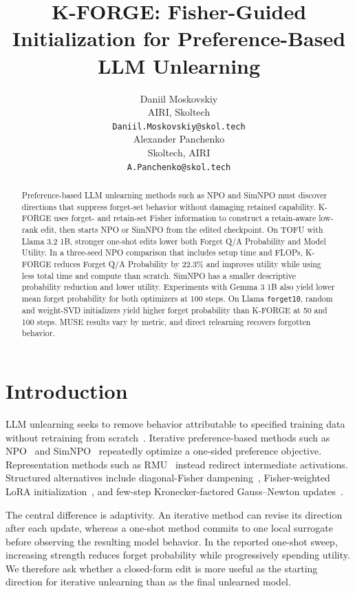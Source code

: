 \documentclass[11pt]{article}
\title{K-FORGE: Fisher-Guided Initialization for Preference-Based LLM Unlearning}
\author{Daniil Moskovskiy \\
  AIRI, Skoltech \\
  \texttt{Daniil.Moskovskiy@skol.tech} \\\And
  Alexander Panchenko \\
  Skoltech, AIRI \\
  \texttt{A.Panchenko@skol.tech} \\}
\begin{document}
\maketitle
\begin{abstract}
Preference-based LLM unlearning methods such as NPO and SimNPO must discover directions that suppress forget-set behavior without damaging retained capability. K-FORGE uses forget- and retain-set Fisher information to construct a retain-aware low-rank edit, then starts NPO or SimNPO from the edited checkpoint. On TOFU with Llama 3.2 1B, stronger one-shot edits lower both Forget Q/A Probability and Model Utility. In a three-seed NPO comparison that includes setup time and FLOPs, K-FORGE reduces Forget Q/A Probability by 22.3\% and improves utility while using less total time and compute than scratch. SimNPO has a smaller descriptive probability reduction and lower utility. Experiments with Gemma 3 1B also yield lower mean forget probability for both optimizers at 100 steps. On Llama \texttt{forget10}, random and weight-SVD initializers yield higher forget probability than K-FORGE at 50 and 100 steps.
MUSE results vary by metric, and direct relearning recovers forgotten behavior.\end{abstract}

\section{Introduction}

LLM unlearning seeks to remove behavior attributable to specified training data without retraining from scratch~\citep{tofu,rmu,muse}. Iterative preference-based methods such as NPO~\citep{npo} and SimNPO~\citep{simnpo} repeatedly optimize a one-sided preference objective. Representation methods such as RMU~\citep{rmu} instead redirect intermediate activations. Structured alternatives include diagonal-Fisher dampening~\citep{foster24}, Fisher-weighted LoRA initialization~\citep{fila}, and few-step Kronecker-factored Gauss--Newton updates~\citep{kfade}.

The central difference is adaptivity. An iterative method can revise its direction after each update, whereas a one-shot method commits to one local surrogate before observing the resulting model behavior. In the reported one-shot sweep, increasing strength reduces forget probability while progressively spending utility. We therefore ask whether a closed-form edit is more useful as the starting direction for iterative unlearning than as the final unlearned model.
\end{document}
